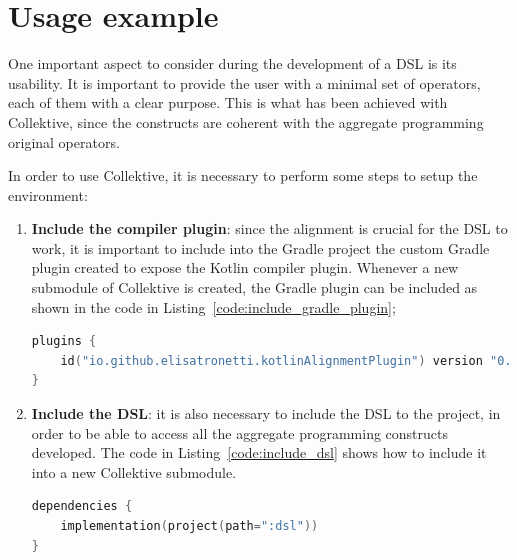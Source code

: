 \section{Usage example}\label{section:usage_example}
One important aspect to consider during the development of a DSL is its usability. It is important to provide the user with a minimal set of operators, each of them with a clear purpose.\newline
This is what has been achieved with Collektive, since the constructs are coherent with the aggregate programming original operators.

In order to use Collektive, it is necessary to perform some steps to setup the environment:
\begin{enumerate}
    \item \textbf{Include the compiler plugin}: since the alignment is crucial for the DSL to work, it is important to include into the Gradle project the custom Gradle plugin created to expose the Kotlin compiler plugin.\newline
    Whenever a new submodule of Collektive is created, the Gradle plugin can be included as shown in the code in Listing~\ref{code:include_gradle_plugin};
\begin{lstlisting}[caption={Inclusion of the custom Gradle plugin to a local Gradle submodule}, captionpos=b, language=Kotlin, label={code:include_gradle_plugin}]
plugins {
    id("io.github.elisatronetti.kotlinAlignmentPlugin") version "0.1.0"
}
\end{lstlisting}
    \item \textbf{Include the DSL}: it is also necessary to include the DSL to the project, in order to be able to access all the aggregate programming constructs developed. The code in Listing~\ref{code:include_dsl} shows how to include it into a new Collektive submodule.
\begin{lstlisting}[caption={Inclusion of the DSL to a local Gradle submodule}, captionpos=b, language=Kotlin, label={code:include_dsl}]
dependencies {
    implementation(project(path=":dsl"))
}
\end{lstlisting}
\end{enumerate}

